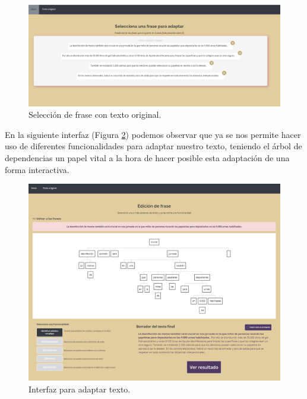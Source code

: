 \begin{figure}[h!]
	\centering
	
	
	\includegraphics[scale=0.4]{Imagenes/Figuras/FrasesTextoCompleto}
	
	
	\caption{Selección de frase con texto original.}
	\label{fig:interfazIntroducirCompleto}
\end{figure}


En la siguiente interfaz (Figura \ref{fig:interfazArbolFuncionalidades}) podemos observar que ya se nos permite hacer uso de diferentes funcionalidades para adaptar nuestro texto, teniendo el árbol de dependencias un papel vital a la hora de hacer posible esta adaptación de una forma interactiva.
\begin{figure}[H]
	\centering
	
	
	\includegraphics[scale=0.6]{Imagenes/Figuras/ArbolYFuncionalidades}
	
	
	\caption{Interfaz para adaptar texto.}
	\label{fig:interfazArbolFuncionalidades}
\end{figure}


